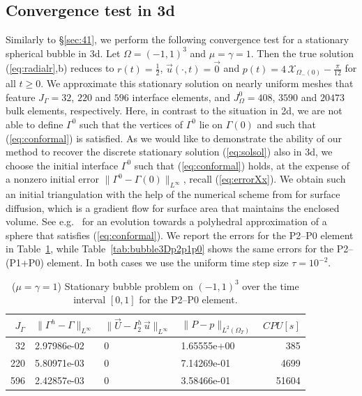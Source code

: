 \documentclass[a4paper,12pt,onecolumn]{article}
\newcommand{\bigchi}{\ensuremath{\mathrm{\mathcal{X}}}}
\newcommand{\charfcn}[1]{\bigchi_{#1}} %
\newcommand{\errorXx}{\|\Gamma^h - \Gamma\|_{L^\infty}}
\newcommand{\errorUu}[1]{\|\vec U - I^h_{#1}\,\vec u\|_{L^\infty}}
\newcommand{\LerrorPp}{\|P - p\|_{L^2(\Omega_T)}}
\begin{document}
\subsection{Convergence test in 3d} \label{sec:45}
Similarly to \S\ref{sec:41}, we perform the following convergence test for a
stationary spherical bubble in 3d. Let $\Omega = (-1,1)^3$ and 
$\mu = \gamma = 1$. Then the true solution (\ref{eq:radialr},b) reduces to 
$r(t) = \frac{1}{2}$, $\vec u(\cdot, t) = \vec 0$ and 
$p(t) = 4\,\charfcn{\Omega_-(0)} - \frac{\pi}{12}$ for all $t\geq0$. We 
approximate this stationary solution on nearly uniform meshes that feature
$J_\Gamma = 32$, $220$ and $596$ interface elements, and
$J_\Omega^0 = 408$, $3590$ and $20473$ bulk elements, respectively. Here, in 
contrast to the situation in 2d, we are not able to define $\Gamma^0$
such that the vertices of $\Gamma^0$ lie on $\Gamma(0)$ and such that
(\ref{eq:conformal}) is satisfied. As we would like to demonstrate the ability
of our method to recover the discrete stationary solution (\ref{eq:solsol})
also in 3d, we choose the initial interface $\Gamma^0$ such that 
(\ref{eq:conformal}) holds, at the expense of a nonzero initial error
$\| \Gamma^0 - \Gamma(0) \|_{L^\infty}$, recall (\ref{eq:errorXx}). We obtain 
such an initial triangulation with the help of the numerical scheme from 
\cite{gflows3d} for surface diffusion, which is a gradient flow for
surface area that maintains the enclosed volume. See e.g.\ 
\cite[Fig.\ 11]{gflows3d} for an evolution towards a polyhedral approximation 
of a sphere that satisfies (\ref{eq:conformal}). We report the errors for the 
P2--P0 element in Table~\ref{tab:bubble3Dp2p0}, while 
Table~\ref{tab:bubble3Dp2p1p0} shows the same errors for the P2--(P1+P0) 
element. In both cases we use the uniform time step size $\tau = 10^{-2}$.
\begin{table}
\center
\begin{tabular}{rlllr}
\hline
$J_\Gamma$ & $\errorXx$ & $\errorUu2$ & $\LerrorPp$ & $CPU[s]$ \\
\hline
 32 & 2.97986e-02 & 0 & 1.65555e+00 &   385 \\
220 & 5.80971e-03 & 0 & 7.14269e-01 &  4699 \\
596 & 2.42857e-03 & 0 & 3.58466e-01 & 51604 \\
\hline
\end{tabular}
\caption{($\mu=\gamma=1$) Stationary bubble problem on $(-1,1)^3$ over the time 
interval $[0,1]$ for the P2--P0 element.}
\label{tab:bubble3Dp2p0}
\end{table}
\end{document}

